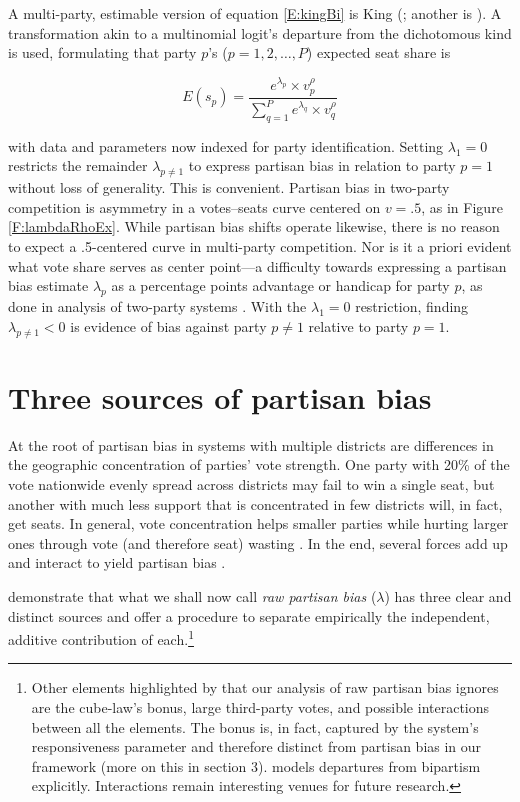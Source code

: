 \documentclass[letter,12pt]{article}
\begin{document}
A multi-party, estimable version of equation \ref{E:kingBi} is King (\citeyear{king.1990elRespBiasMultiparty}; another is \citeauthor{calvo.micozzi.govReform.2005} \citeyear{calvo.micozzi.govReform.2005}). A transformation akin to a multinomial logit's departure from the dichotomous kind is used, formulating that party $p$'s ($p=1,2,\ldots,P$) expected seat share is 

\begin{equation}\label{E:kingMulti}
 E(s_p) = \frac{e^{\lambda_p} \times v_p^\rho}{\sum_{q=1}^{P} e^{\lambda_q} \times v_q^\rho}
\end{equation}

\noindent with data and parameters now indexed for party identification. Setting $\lambda_1 = 0$ restricts the remainder $\lambda_{p \neq 1}$ to express partisan bias in relation to party $p=1$ without loss of generality. This is convenient. Partisan bias in two-party competition is asymmetry in a votes--seats curve centered on $v=.5$, as in Figure \ref{F:lambdaRhoEx}. While partisan bias shifts operate likewise, there is no reason to expect a .5-centered curve in multi-party competition. Nor is it a priori evident what vote share serves as center point---a difficulty towards expressing a partisan bias estimate $\hat{\lambda}_p$ as a percentage points advantage or handicap for party $p$, as done in analysis of two-party systems \citep[e.g.,][]{cox.katz.2002}. With the $\lambda_1 = 0$ restriction, finding $\lambda_{p \neq 1}<0$ is evidence of bias against party $p \neq 1$ relative to party $p=1$.

\section{Three sources of partisan bias}

At the root of partisan bias in systems with multiple districts are differences in the geographic concentration of parties' vote strength. One party with 20\% of the vote nationwide evenly spread across districts may fail to win a single seat, but another with much less support that is concentrated in few districts will, in fact, get seats. In general, vote concentration helps smaller parties while hurting larger ones through vote (and therefore seat) wasting \citep{calvo.roddenMultipartyPlurality2015}. In the end, several forces add up and interact to yield partisan bias \citep{gudgin.taylor.1980decomposeBias}. 

\citet[][, henceforth GKB]{grofman.etalBiasMalapp.1997} demonstrate that what we shall now call \emph{raw partisan bias} ($\lambda$) has three clear and distinct sources and offer a procedure to separate empirically the independent, additive contribution of each.\footnote{Other elements highlighted by \citet{gudgin.taylor.1980decomposeBias} that our analysis of raw partisan bias ignores are the cube-law's bonus, large third-party votes, and possible interactions between all the elements. The bonus is, in fact, captured by the system's responsiveness parameter and therefore distinct from partisan bias in our framework (more on this in section 3). \citet{calvo.2009roadToPR} models departures from bipartism explicitly. Interactions remain interesting venues for future research.} 
\end{document}

